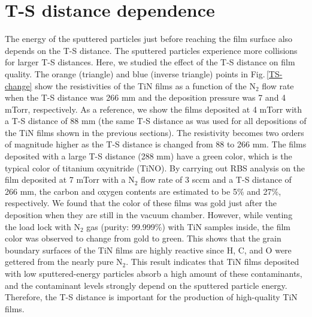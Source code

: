 \section{T-S distance dependence}
\label{T-S DISTANCE DEPENDENCE}
The energy of the sputtered particles just before reaching the film surface also depends on the T-S distance. The sputtered particles experience more collisions for larger T-S distances. Here, we studied the effect of the T-S distance on film quality. The orange (triangle) and blue (inverse triangle) points in Fig.\,\ref{TS-change} show the resistivities of the TiN films as a function of the N$_{2}$ flow rate when the T-S distance was 266 mm and the deposition pressure was 7 and 4 mTorr, respectively. As a reference, we show the films deposited at 4 mTorr with a T-S distance of 88 mm (the same T-S distance as was used for all depositions of the TiN films shown in the previous sections). The resistivity becomes two orders of magnitude higher as the T-S distance is changed from 88 to 266 mm. The films deposited with a large T-S distance (288 mm) have a green color, which is the typical color of titanium oxynitride (TiNO). By carrying out RBS analysis on the film deposited at 7 mTorr with a N$_{2}$ flow rate of 3 sccm and a T-S distance of 266 mm, the carbon and oxygen contents are estimated to be 5\% and 27\%, respectively. We found that the color of these films was gold just after the deposition when they are still in the vacuum chamber. However, while venting the load lock with N$_{2}$ gas (purity: 99.999\%) with TiN samples inside, the film color was observed to change from gold to green.  This shows that the grain boundary surfaces of the TiN films are highly reactive since H, C, and O were gettered from the nearly pure N$_{2}$. This result indicates that TiN films deposited with low sputtered-energy particles absorb a high amount of these contaminants, and the contaminant levels strongly depend on the sputtered particle energy. Therefore, the T-S distance is important for the production of high-quality TiN films.\cite{T-SComment}
